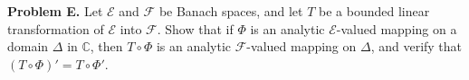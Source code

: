 \textbf{Problem E.} Let $\mathcal{E}$ and $\mathcal{F}$ be Banach spaces, and let $T$ be a bounded linear transformation of $\mathcal{E}$ into $\mathcal{F}$. Show that if $\Phi$ is an analytic $\mathcal{E}$-valued mapping on a domain $\Delta$ in $\mathbb{C}$, then $T \circ \Phi$ is an analytic $\mathcal{F}$-valued mapping on $\Delta$, and verify that $(T \circ \Phi)' = T \circ \Phi'$.
